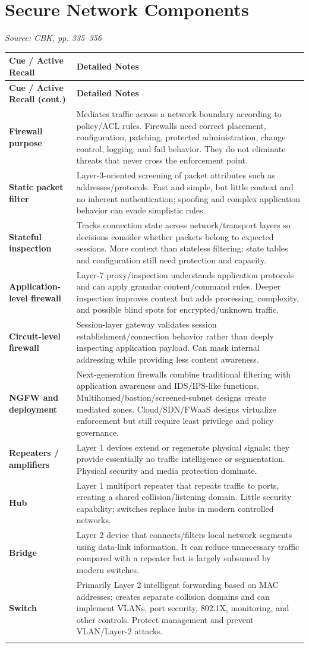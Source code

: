 \documentclass[10pt,letterpaper]{article}
\makeatletter
\newenvironment{cornell}{\rowcolors{2}{white}{notebg}\begin{longtable}{@{}>{\raggedright\arraybackslash\columncolor{cuebg}\color{navy}\bfseries}p{0.285\textwidth}>{\raggedright\arraybackslash}p{0.65\textwidth}@{}}\rowcolor{navy}\color{white}\textbf{Cue / Active Recall} & \color{white}\textbf{Detailed Notes}\\ \hline\endfirsthead\rowcolor{navy}\color{white}\textbf{Cue / Active Recall (cont.)} & \color{white}\textbf{Detailed Notes}\\ \hline\endhead}{\end{longtable}}
\newcommand{\noterow}[2]{#1 & #2\\\arrayrulecolor{line}\hline}\newcommand{\source}[1]{\par{\footnotesize\color{teal}\textit{Source: CBK, #1}}\par}
\makeatother
\begin{document}
\section{\color{navy}Secure Network Components}
\source{pp. 335--356}
\begin{cornell}
\noterow{Firewall purpose}{Mediates traffic across a network boundary according to policy/ACL rules. Firewalls need correct placement, configuration, patching, protected administration, change control, logging, and fail behavior. They do not eliminate threats that never cross the enforcement point.}
\noterow{Static packet filter}{Layer-3-oriented screening of packet attributes such as addresses/protocols. Fast and simple, but little context and no inherent authentication; spoofing and complex application behavior can evade simplistic rules.}
\noterow{Stateful inspection}{Tracks connection state across network/transport layers so decisions consider whether packets belong to expected sessions. More context than stateless filtering; state tables and configuration still need protection and capacity.}
\noterow{Application-level firewall}{Layer-7 proxy/inspection understands application protocols and can apply granular content/command rules. Deeper inspection improves context but adds processing, complexity, and possible blind spots for encrypted/unknown traffic.}
\noterow{Circuit-level firewall}{Session-layer gateway validates session establishment/connection behavior rather than deeply inspecting application payload. Can mask internal addressing while providing less content awareness.}
\noterow{NGFW and deployment}{Next-generation firewalls combine traditional filtering with application awareness and IDS/IPS-like functions. Multihomed/bastion/screened-subnet designs create mediated zones. Cloud/SDN/FWaaS designs virtualize enforcement but still require least privilege and policy governance.}
\noterow{Repeaters / amplifiers}{Layer 1 devices extend or regenerate physical signals; they provide essentially no traffic intelligence or segmentation. Physical security and media protection dominate.}
\noterow{Hub}{Layer 1 multiport repeater that repeats traffic to ports, creating a shared collision/listening domain. Little security capability; switches replace hubs in modern controlled networks.}
\noterow{Bridge}{Layer 2 device that connects/filters local network segments using data-link information. It can reduce unnecessary traffic compared with a repeater but is largely subsumed by modern switches.}
\noterow{Switch}{Primarily Layer 2 intelligent forwarding based on MAC addresses; creates separate collision domains and can implement VLANs, port security, 802.1X, monitoring, and other controls. Protect management and prevent VLAN/Layer-2 attacks.}

\end{cornell}
\end{document}

